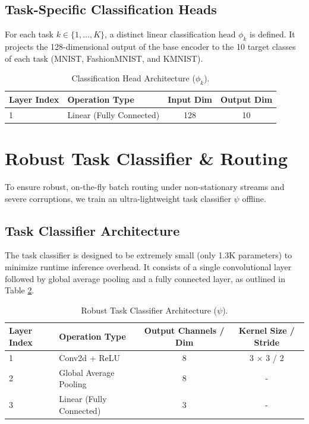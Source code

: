 \documentclass{article}
\theoremstyle{plain}
\theoremstyle{definition}
\theoremstyle{remark}
\begin{document}
\subsection{Task-Specific Classification Heads}
For each task $k \in \{1, \dots, K\}$, a distinct linear classification head $\phi_k$ is defined. It projects the 128-dimensional output of the base encoder to the 10 target classes of each task (MNIST, FashionMNIST, and KMNIST).
\begin{table}[h]
\caption{Classification Head Architecture ($\phi_k$).}
\label{tab:head_architecture}
\begin{center}
\begin{tabular}{llcc}
\toprule
Layer Index & Operation Type & Input Dim & Output Dim \\
\midrule
1 & Linear (Fully Connected) & 128 & 10 \\
\bottomrule
\end{tabular}
\end{center}
\end{table}

\section{Robust Task Classifier \& Routing}
To ensure robust, on-the-fly batch routing under non-stationary streams and severe corruptions, we train an ultra-lightweight task classifier $\psi$ offline.

\subsection{Task Classifier Architecture}
The task classifier is designed to be extremely small (only 1.3K parameters) to minimize runtime inference overhead. It consists of a single convolutional layer followed by global average pooling and a fully connected layer, as outlined in Table \ref{tab:classifier_architecture}.

\begin{table}[h]
\caption{Robust Task Classifier Architecture ($\psi$).}
\label{tab:classifier_architecture}
\begin{center}
\begin{tabular}{llcc}
\toprule
Layer Index & Operation Type & Output Channels / Dim & Kernel Size / Stride \\
\midrule
1 & Conv2d + ReLU & 8 & 3 $\times$ 3 / 2 \\
2 & Global Average Pooling & 8 & - \\
3 & Linear (Fully Connected) & 3 & - \\
\bottomrule
\end{tabular}
\end{center}
\end{table}
\end{document}
